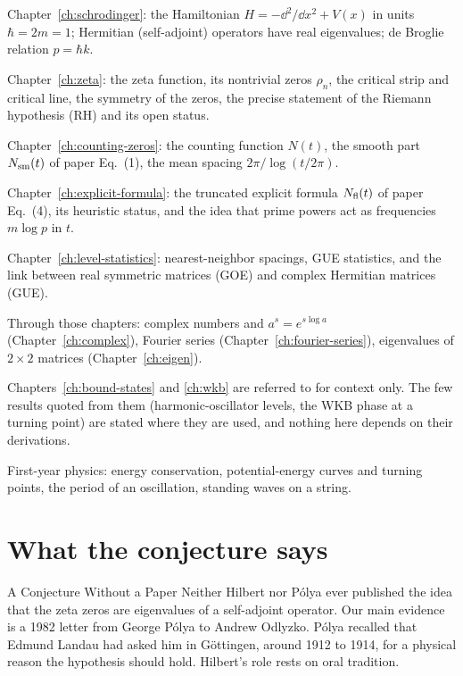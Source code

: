 \begin{prerequisites}
\item Chapter~\ref{ch:schrodinger}: the Hamiltonian $H=-\dd^2/\dd x^2+V(x)$ in units $\hbar=2m=1$; Hermitian (self-adjoint) operators have real eigenvalues; de Broglie relation $p=\hbar k$.
\item Chapter~\ref{ch:zeta}: the zeta function, its nontrivial zeros $\rho_n$, the critical strip and critical line, the symmetry of the zeros, the precise statement of the Riemann hypothesis (RH) and its open status.
\item Chapter~\ref{ch:counting-zeros}: the counting function $N(t)$, the smooth part $N_{\mathrm{sm}}(t)$ of paper Eq.~(1), the mean spacing $2\pi/\log(t/2\pi)$.
\item Chapter~\ref{ch:explicit-formula}: the truncated explicit formula $N_{\mathrm{fl}}(t)$ of paper Eq.~(4), its heuristic status, and the idea that prime powers act as frequencies $m\log p$ in $t$.
\item Chapter~\ref{ch:level-statistics}: nearest-neighbor spacings, GUE statistics, and the link between real symmetric matrices (GOE) and complex Hermitian matrices (GUE).
\item Through those chapters: complex numbers and $a^s=e^{s\log a}$ (Chapter~\ref{ch:complex}), Fourier series (Chapter~\ref{ch:fourier-series}), eigenvalues of $2\times2$ matrices (Chapter~\ref{ch:eigen}).
\item Chapters~\ref{ch:bound-states} and \ref{ch:wkb} are referred to for context only. The few results quoted from them (harmonic-oscillator levels, the WKB phase at a turning point) are stated where they are used, and nothing here depends on their derivations.
\item First-year physics: energy conservation, potential-energy curves and turning points, the period of an oscillation, standing waves on a string.
\end{prerequisites}

\section{What the conjecture says}\label{sec:hilbert-polya-conjecture}
\begin{didyouknow}{A Conjecture Without a Paper}
Neither Hilbert nor P\'olya ever published the idea that the zeta zeros are eigenvalues of a self-adjoint operator. Our main evidence is a 1982 letter from George P\'olya to Andrew Odlyzko. P\'olya recalled that Edmund Landau had asked him in G\"ottingen, around 1912 to 1914, for a physical reason the hypothesis should hold. Hilbert's role rests on oral tradition.
\end{didyouknow}

